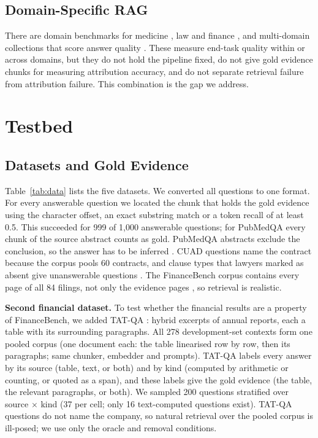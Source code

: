 \documentclass[conference]{IEEEtran}
\begin{document}
\subsection{Domain-Specific RAG}
There are domain benchmarks for medicine \cite{xiong2024medrag}, law \cite{pipitone2024legalbenchrag,hendrycks2021cuad} and finance
\cite{islam2023financebench}, and multi-domain collections that score answer quality \cite{friel2024ragbench,han2024ragqa}. These measure end-task
quality within or across domains, but they do not hold the pipeline fixed, do not give gold evidence chunks for measuring attribution accuracy, and do
not separate retrieval failure from attribution failure. This combination is the gap we address.

\section{Testbed}
\label{sec:testbed}

\subsection{Datasets and Gold Evidence}
Table~\ref{tab:data} lists the five datasets. We converted all questions to one format. For every answerable question we located the chunk that holds
the gold evidence using the character offset, an exact substring match or a token recall of at least 0.5. This succeeded for 999 of 1,000 answerable
questions; for PubMedQA every chunk of the source abstract counts as gold. PubMedQA abstracts exclude the conclusion, so the answer has to be inferred
\cite{jin2019pubmedqa}. CUAD questions name the contract because the corpus pools 60 contracts, and clause types that lawyers marked as absent give
unanswerable questions \cite{hendrycks2021cuad}. The FinanceBench corpus contains every page of all 84 filings, not only the evidence pages
\cite{islam2023financebench}, so retrieval is realistic.

\textbf{Second financial dataset.} To test whether the financial results are a property of FinanceBench, we added TAT-QA \cite{zhu2021tatqa}: hybrid
excerpts of annual reports, each a table with its surrounding paragraphs. All 278 development-set contexts form one pooled corpus (one document each:
the table linearised row by row, then its paragraphs; same chunker, embedder and prompts). TAT-QA labels every answer by its source (table, text, or
both) and by kind (computed by arithmetic or counting, or quoted as a span), and these labels give the gold evidence (the table, the relevant
paragraphs, or both). We sampled 200 questions stratified over source $\times$ kind (37 per cell; only 16 text-computed questions exist). TAT-QA
questions do not name the company, so natural retrieval over the pooled corpus is ill-posed; we use only the oracle and removal conditions.
\end{document}
